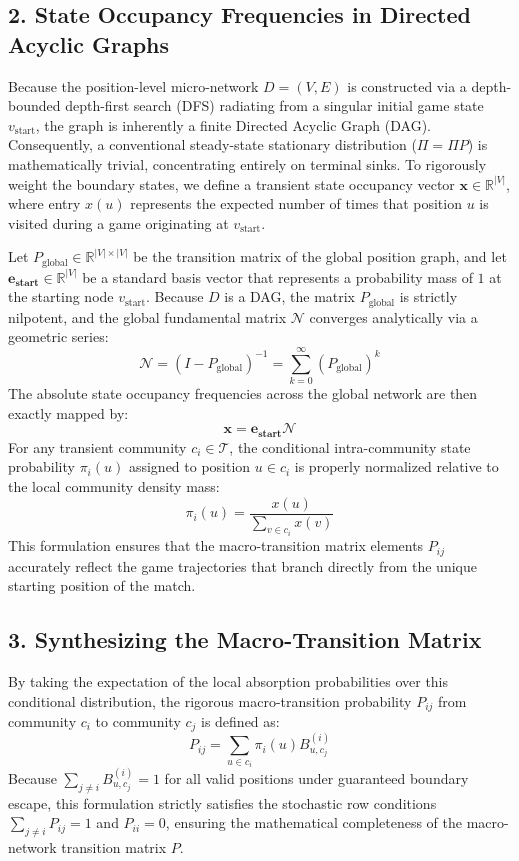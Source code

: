 \documentclass[9pt,twocolumn,twoside]{pnas-report}
\begin{document}
\subsection*{2. State Occupancy Frequencies in Directed Acyclic Graphs}
Because the position-level micro-network $D=(V,E)$ is constructed via a depth-bounded depth-first search (DFS) radiating from a singular initial game state $v_{\text{start}}$, the graph is inherently a finite Directed Acyclic Graph (DAG). Consequently, a conventional steady-state stationary distribution ($\Pi = \Pi P$) is mathematically trivial, concentrating entirely on terminal sinks. To rigorously weight the boundary states, we define a transient state occupancy vector $\mathbf{x} \in \mathbb{R}^{|V|}$, where entry $x(u)$ represents the expected number of times that position $u$ is visited during a game originating at $v_{\text{start}}$.

Let $P_{\text{global}} \in \mathbb{R}^{|V| \times |V|}$ be the transition matrix of the global position graph, and let $\mathbf{e_{\text{start}}} \in \mathbb{R}^{|V|}$ be a standard basis vector that represents a probability mass of $1$ at the starting node $v_{\text{start}}$. Because $D$ is a DAG, the matrix $P_{\text{global}}$ is strictly nilpotent, and the global fundamental matrix $\mathcal{N}$ converges analytically via a geometric series:
\begin{equation}
\mathcal{N} = (I - P_{\text{global}})^{-1} = \sum_{k=0}^{\infty} (P_{\text{global}})^k
\end{equation}
The absolute state occupancy frequencies across the global network are then exactly mapped by:
\begin{equation}
\mathbf{x} = \mathbf{e_{\text{start}}}\mathcal{N}
\end{equation}
For any transient community $c_i \in \mathcal{T}$, the conditional intra-community state probability $\pi_i(u)$ assigned to position $u \in c_i$ is properly normalized relative to the local community density mass:
\begin{equation}
\pi_i(u) = \frac{x(u)}{\sum_{v \in c_i} x(v)}
\end{equation}
This formulation ensures that the macro-transition matrix elements $P_{ij}$ accurately reflect the game trajectories that branch directly from the unique starting position of the match.

\subsection*{3. Synthesizing the Macro-Transition Matrix}
By taking the expectation of the local absorption probabilities over this conditional distribution, the rigorous macro-transition probability $P_{ij}$ from community $c_i$ to community $c_j$ is defined as:
\begin{equation}
P_{ij} = \sum_{u \in c_i} \pi_i(u) B^{(i)}_{u,c_j}
\end{equation}
Because $\sum_{j \neq i} B^{(i)}_{u,c_j} = 1$ for all valid positions under guaranteed boundary escape, this formulation strictly satisfies the stochastic row conditions $\sum_{j \neq i} P_{ij} = 1$ and $P_{ii} = 0$, ensuring the mathematical completeness of the macro-network transition matrix $P$.
\end{document}
